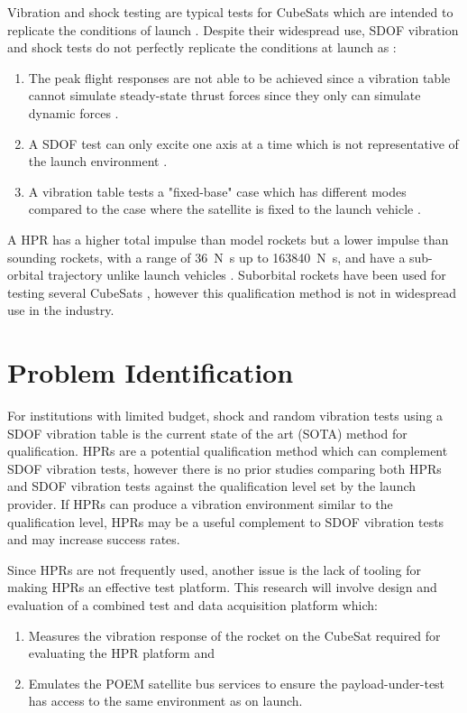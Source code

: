 \documentclass{report}
\begin{document}
Vibration and shock testing are typical tests for CubeSats which are intended to replicate the conditions of launch \cite{welle2020overview}. Despite their widespread use, SDOF vibration and shock tests do not perfectly replicate the conditions at launch as \cite{gordon2015benefits,nath2022study}:
\begin{enumerate}
  \item The peak flight responses are not able to be achieved since a vibration table cannot simulate steady-state thrust forces since they only can simulate dynamic forces \cite{gordon2015benefits}.
  \item A SDOF test can only excite one axis at a time which is not representative of the launch environment \cite{gordon2015benefits,nath2022study}.
  \item A vibration table tests a "fixed-base" case which has different modes compared to the case where the satellite is fixed to the launch vehicle \cite{gordon2015benefits}.
\end{enumerate}

A HPR has a higher total impulse than model rockets but a lower impulse than sounding rockets, with a range of \SI{36}{\newton\second} up to \SI{163840}{\newton\second}, and have a sub-orbital trajectory unlike launch vehicles \cite{pierce2019development}. Suborbital rockets have been used for testing several CubeSats \cite{9316404,minelli2019mobile}, however this qualification method is not in widespread use in the industry.

\section{Problem Identification}
For institutions with limited budget, shock and random vibration tests using a SDOF vibration table is the current state of the art (SOTA) method for qualification. HPRs are a potential qualification method which can complement SDOF vibration tests, however there is no prior studies comparing both HPRs and SDOF vibration tests against the qualification level set by the launch provider. If HPRs can produce a vibration environment similar to the qualification level, HPRs may be a useful complement to SDOF vibration tests and may increase success rates.

Since HPRs are not frequently used, another issue is the lack of tooling for making HPRs an effective test platform. This research will involve design and evaluation of a combined test and data acquisition platform which:
\begin{enumerate}
  \item Measures the vibration response of the rocket on the CubeSat required for evaluating the HPR platform and
  \item Emulates the POEM satellite bus services to ensure the payload-under-test has access to the same environment as on launch.
\end{enumerate}
\end{document}
